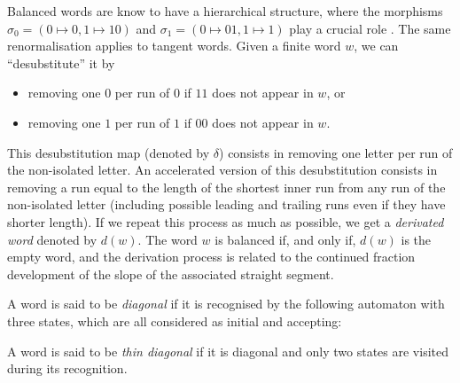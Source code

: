 \documentclass[preliminary]{eptcs}
\begin{document}
Balanced words are know to have a hierarchical structure, where the
morphisms $ \sigma_0 = ( 0 \mapsto 0 , 1 \mapsto 10 )$ and $ \sigma_1 = (
0 \mapsto 01 , 1 \mapsto 1 )$ play a crucial role \cite{PytheasFogg2002}
\cite{Lothaire2002}.
The same renormalisation applies to tangent words.
\newline
Given a finite word $w$, we can ``desubstitute'' it by 
\begin{itemize}
\item removing one $0$ per run of $0$ if $11$ does not appear in $w$, or
\item removing one $1$ per run of $1$ if $00$ does not appear in $w$.
\end{itemize}
This desubstitution map (denoted by $\delta$) consists in removing one
letter per run of the non-isolated letter. An accelerated version of this
desubstitution consists in removing a run equal to the length of the
shortest inner run from any run of the non-isolated letter (including
possible leading and trailing runs even if they have shorter length). 
\newline
If we repeat this process as much as possible, we get a \emph{derivated
word} denoted by $d(w)$. The word $w$ is balanced if, and only if, $d(w)$
is the empty word, and the derivation process is related to the continued
fraction development of the slope of the associated straight segment.


A word is said to be \emph{diagonal} if it is recognised by the following
automaton with three states, which are all considered as initial and
accepting: 
\begin{center}
\end{center}


A word is said to be \emph{thin diagonal} if it is diagonal and only two
states are visited during its recognition.
\end{document}
